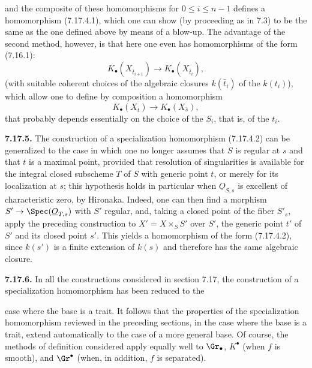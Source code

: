 %
and the composite of these homomorphisms for \(0\leq i\leq n-1\) defines a homomorphism (7.17.4.1), which one can show (by proceeding as in 7.3) to be the same as the one defined above by means of a blow-up. The advantage of the second method, however, is that here one even has homomorphisms of the form (7.16.1):
\[
  K_\bullet(X_{\bar t_{i+1}})\longrightarrow K_\bullet(X_{\bar t_i}),
\]
(with suitable coherent choices of the algebraic closures \(k(\bar t_i)\) of the \(k(t_i)\)), which allow one to define by composition a homomorphism
\begin{equation}\tag{7.17.4.2}
  K_\bullet(X_{\bar t})\longrightarrow K_\bullet(X_{\bar s}),
\end{equation}
that probably depends essentially on the choice of the \(S_i\), that is, of the \(t_i\).

\textbf{7.17.5.} The construction of a specialization homomorphism (7.17.4.2) can be generalized to the case in which one no longer assumes that \(S\) is regular at \(s\) and that \(t\) is a maximal point, provided that resolution of singularities is available for the integral closed subscheme \(T\) of \(S\) with generic point \(t\), or merely for its localization at \(s\); this hypothesis holds in particular when \(\underline{O}_{S,s}\) is excellent of characteristic zero, by Hironaka. Indeed, one can then find a morphism \(S'\to \Spec(\underline{O}_{T,s})\) with \(S'\) regular, and, taking a closed point of the fiber \(S'_s\), apply the preceding construction to \(X'=X\times_S S'\) over \(S'\), the generic point \(t'\) of \(S'\) and its closed point \(s'\). This yields a homomorphism of the form (7.17.4.2), since \(k(s')\) is a finite extension of \(k(s)\) and therefore has the same algebraic closure.

\textbf{7.17.6.} In all the constructions considered in section 7.17, the construction of a specialization homomorphism has been reduced to the

%
case where the base is a trait. It follows that the properties of the specialization homomorphism reviewed in the preceding sections, in the case where the base is a trait, extend automatically to the case of a more general base. Of course, the methods of definition considered apply equally well to \(\Gr_\bullet\), \(K^\bullet\) (when \(f\) is smooth), and \(\Gr^\bullet\) (when, in addition, \(f\) is separated).

